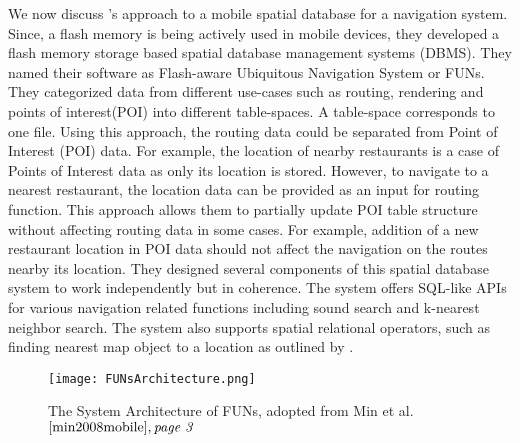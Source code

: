 We now discuss \citet{min2008mobile}'s approach to a mobile spatial database for a navigation system. Since, a flash memory is being actively used in mobile devices, they developed a flash memory storage based spatial database management systems (DBMS). They named their software as Flash-aware Ubiquitous Navigation System or FUNs. They categorized data from different use-cases such as routing, rendering and points of interest(POI) into different table-spaces. A table-space corresponds to one file. Using this approach, the routing data could be separated from Point of Interest (POI) data. For example, the location of nearby restaurants is a case of Points of Interest data as only its location is stored. However, to navigate to a nearest restaurant, the location data can be provided as an input for routing function. This approach allows them to partially update POI table structure without affecting routing data in some cases. For example, addition of a new restaurant location in POI data should not affect the navigation on the routes nearby its location. They designed several components of this spatial database system to work independently but in coherence. The system offers SQL-like APIs for various navigation related functions including sound search and k-nearest neighbor search. The system also supports spatial relational operators, such as finding nearest map object to a location as outlined by \citet{lee1998perf}. \\
\begin{figure}
\texttt{[image: FUNsArchitecture.png]}
\caption{The System Architecture of FUNs, adopted from Min et al.$\cite{min2008mobile}, \textit{page 3}$}
\label{fg:sysArchFun}
\end{figure}

